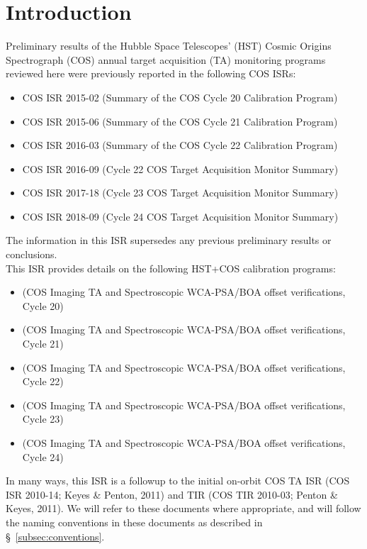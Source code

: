 \section{Introduction}\label{sec:Introduction}
Preliminary results of the Hubble Space Telescopes' (HST) Cosmic Origins Spectrograph (COS)
annual target acquisition (TA) monitoring programs reviewed here were previously reported in the following COS ISRs:
\begingroup
\small
\begin{itemize}
\setlength\itemsep{0.1em}
\item{COS ISR 2015-02 (Summary of the COS Cycle 20 Calibration Program)}
\item{COS ISR 2015-06 (Summary of the COS Cycle 21 Calibration Program)}
\item{COS ISR 2016-03 (Summary of the COS Cycle 22 Calibration Program)}
\item{COS ISR 2016-09 (Cycle 22 COS Target Acquisition Monitor Summary)}
\item{COS ISR 2017-18 (Cycle 23 COS Target Acquisition Monitor Summary)}
\item{COS ISR 2018-09 (Cycle 24 COS Target Acquisition Monitor Summary)}
\end{itemize}
\normalsize
\endgroup
\noindent The information in this ISR supersedes any previous preliminary results or conclusions.\\

This ISR provides details on the following HST+COS calibration programs:
\small
\begin{itemize}
\setlength\itemsep{0.1em}
\item{ (COS Imaging TA and Spectroscopic WCA-PSA/BOA offset verifications, Cycle 20)}
\item{ (COS Imaging TA and Spectroscopic WCA-PSA/BOA offset verifications, Cycle 21)}
\item{ (COS Imaging TA and Spectroscopic WCA-PSA/BOA offset verifications, Cycle 22)}
\item{ (COS Imaging TA and Spectroscopic WCA-PSA/BOA offset verifications, Cycle 23)}
\item{ (COS Imaging TA and Spectroscopic WCA-PSA/BOA offset verifications, Cycle 24)}
\end{itemize}
\normalsize

In many ways, this ISR is a followup to the initial on-orbit COS TA ISR (COS ISR 2010-14; Keyes \& Penton, 2011) and TIR (COS TIR 2010-03; Penton \& Keyes, 2011).
We will refer to these documents where appropriate, and will follow the naming conventions in these documents as described
in \S~\ref{subsec:conventions}.
\clearpage


